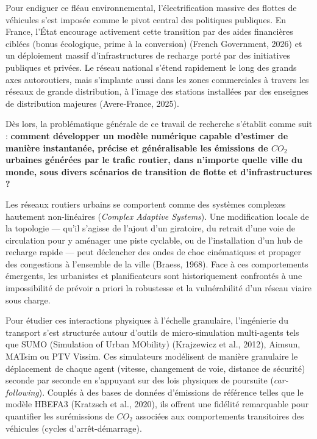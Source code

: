 \documentclass[10pt, a4paper]{article}
\begin{document}
Pour endiguer ce fléau environnemental, l'électrification massive des
flottes de véhicules s'est imposée comme le pivot central des politiques
publiques. En France, l'État encourage activement cette transition par
des aides financières ciblées (bonus écologique, prime à la conversion)
(French Government, 2026) et un déploiement massif d'infrastructures de
recharge porté par des initiatives publiques et privées. Le réseau
national s'étend rapidement le long des grands axes autoroutiers, mais
s'implante aussi dans les zones commerciales à travers les réseaux de
grande distribution, à l'image des stations installées par des enseignes
de distribution majeures (Avere-France, 2025).

Dès lors, la problématique générale de ce travail de recherche s'établit
comme suit : \textbf{comment développer un modèle numérique capable
d'estimer de manière instantanée, précise et généralisable les émissions
de \(CO_2\) urbaines générées par le trafic routier, dans n'importe
quelle ville du monde, sous divers scénarios de transition de flotte et
d'infrastructures ?}

Les réseaux routiers urbains se comportent comme des systèmes complexes
hautement non-linéaires (\emph{Complex Adaptive Systems}). Une
modification locale de la topologie --- qu'il s'agisse de l'ajout d'un
giratoire, du retrait d'une voie de circulation pour y aménager une
piste cyclable, ou de l'installation d'un hub de recharge rapide ---
peut déclencher des ondes de choc cinématiques et propager des
congestions à l'ensemble de la ville (Braess, 1968). Face à ces
comportements émergents, les urbanistes et planificateurs sont
historiquement confrontés à une impossibilité de prévoir a priori la
robustesse et la vulnérabilité d'un réseau viaire sous charge.

Pour étudier ces interactions physiques à l'échelle granulaire,
l'ingénierie du transport s'est structurée autour d'outils de
micro-simulation multi-agents tels que SUMO (Simulation of Urban
MObility) (Krajzewicz et al., 2012), Aimsun, MATsim ou PTV Vissim. Ces
simulateurs modélisent de manière granulaire le déplacement de chaque
agent (vitesse, changement de voie, distance de sécurité) seconde par
seconde en s'appuyant sur des lois physiques de poursuite
(\emph{car-following}). Couplés à des bases de données d'émissions de
référence telles que le modèle HBEFA3 (Kratzsch et al., 2020), ils
offrent une fidélité remarquable pour quantifier les surémissions de
\(CO_2\) associées aux comportements transitoires des véhicules (cycles
d'arrêt-démarrage).
\end{document}
